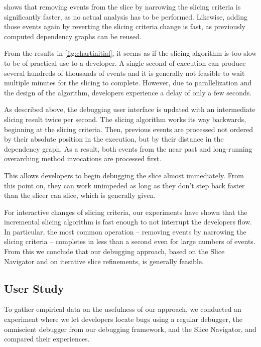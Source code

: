 \documentclass[
			english,
			review,
			]{elsarticle}
\begin{document}
 shows that removing events from the slice by narrowing the slicing criteria is significantly faster, as no actual analysis has to be performed.
Likewise, adding those events again by reverting the slicing criteria change is fast, as previously computed dependency graphs can be reused.

\medskip

From the results in \cref{fig:chartinitial}, it seems as if the slicing algorithm is too slow to be of practical use to a developer.
A single second of execution can produce several hundreds of thousands of events and it is generally not feasible to wait multiple minutes for the slicing to complete.
However, due to parallelization and the design of the algorithm, developers experience a delay of only a few seconds.

As described above, the debugging user interface is updated with an intermediate slicing result twice per second.
The slicing algorithm works its way backwards, beginning at the slicing criteria.
Then, previous events are processed not ordered by their absolute position in the execution, but by their distance in the dependency graph.
As a result, both events from the near past and long-running overarching method invocations are processed first.

This allows developers to begin debugging the slice almost immediately. 
From this point on, they can work unimpeded as long as they don't step back faster than the slicer can slice, which is generally given.

For interactive changes of slicing criteria, our experiments have shown that the incremental slicing algorithm is fast enough to not interrupt the developers flow.
In particular, the most common operation -- removing events by narrowing the slicing criteria -- completes in less than a second even for large numbers of events.
From this we conclude that our debugging approach, based on the Slice Navigator and on iterative slice refinements, is generally feasible.

\subsection{User Study}

To gather empirical data on the usefulness of our approach, we conducted an experiment where we let developers locate bugs using a regular debugger, the omniscient debugger from our debugging framework, and the Slice Navigator, and compared their experiences.
\end{document}
